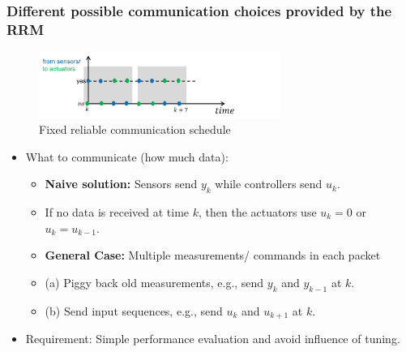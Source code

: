 \documentclass{beamer}
\begin{document}
\begin{frame}
\frametitle{Different possible communication choices provided by the RRM}
\vspace*{-.3in}
\begin{figure}
\centering
\includegraphics[width=0.7\textwidth, height = .25\textheight]{timing.png}
 \caption{{\footnotesize Fixed reliable communication schedule}} 
\end{figure}
\vspace*{-.3in}
\begin{itemize}
 \item What to communicate (how much data):
 \begin{itemize}
  \item \textbf{Naive solution:} Sensors send $y_k$ while controllers send $u_k$.
  \item[] If no data is received at time $k$, then the actuators use $u_k = 0$ or $u_k = u_{k-1}$.
 \end{itemize}
  \begin{itemize}
   \item \textbf{General Case:} Multiple measurements/ commands in each packet
   \item[] (a) Piggy back old measurements, e.g., send $y_k$ and $y_{k-1}$ at $k$.
   \item[] (b) Send input sequences, e.g., send $u_{k}$ and $u_{k+1}$ at $k$.
  \end{itemize}
  \item Requirement: Simple performance evaluation and avoid influence of tuning.
\end{itemize}
\end{frame}
\end{document}
